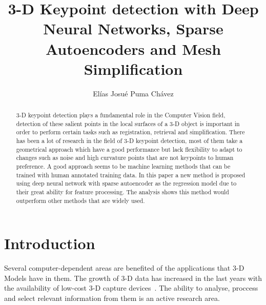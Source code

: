 \documentclass{comjnl}
\begin{document}
\title[3-D Keypoint detection with DNNs]{3-D Keypoint detection with Deep Neural Networks,
Sparse Autoencoders and Mesh Simplification}
\author{El\'{i}as Josu\'{e} Puma Ch\'{a}vez}






\begin{abstract}
3-D keypoint detection plays a fundamental role in the Computer Vision field, detection
of these salient points in the local surfaces of a 3-D object is important in order to 
perform certain tasks such as registration, retrieval and simplification. There has been
a lot of research in the field of 3-D keypoint detection, most of them take a geometrical 
approach which have a good performance but lack flexibility to adapt to changes such as
noise and high curvature points that are not keypoints to human preference. A good
approach seems to be machine learning methods that can be trained with human annotated 
training data. In this paper a new method is proposed using deep neural network with 
sparse autoencoder as the regression model due to their great ability for feature processing. 
The analysis shows this method would outperform other methods that are widely used. 
\end{abstract}

\maketitle


\section{Introduction}
Several computer-dependent areas are benefited of the applications
that 3-D Models have in them. The growth of 3-D data has increased in
the last years with the availability of low-cost 3-D capture devices~\cite{harris3D}.
The ability to analyse, proccess and select relevant information
from them is an active research area. 
\end{document}
